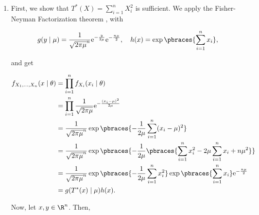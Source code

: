 \begin{solution}

\phantom{}

\begin{enumerate}[label = (\alph*)]

    \item First, we show that $T^\ast(X) = \sum_{i=1}^n X_i^2$ is sufficient.
    We apply the Fisher-Neyman Factorization theorem \cite[lecture 8, slide 13]{EStat}, with

    \begin{align*}
        g(y \mid \mu) = \frac{1}{\sqrt{2 \pi \mu}^n} \mathrm e^{-\frac{y}{2 \mu}} \mathrm e^{-\frac{n \mu}{2}},
        \quad
        h(x) = \exp \pbraces{\sum_{i=1}^n x_i},
    \end{align*}

    and get

    \begin{align*}
        f_{X_1, \dots, X_n}(x \mid \theta)
        & =
        \prod_{i=1}^n
            f_{X_i}(x_i \mid \theta) \\
        & =
        \prod_{i=1}^n
            \frac{1}{\sqrt{2 \pi \mu}}
            \mathrm e^{-\frac{(x_i - \mu)^2}{2 \mu}} \\
        & =
        \frac{1}{\sqrt{2 \pi \mu}^n}
        \exp
        \pbraces
        {
            -\frac{1}{2 \mu}
            \sum_{i=1}^n
                (x_i - \mu)^2
        } \\
        & =
        \frac{1}{\sqrt{2 \pi \mu}^n}
        \exp
        \pbraces
        {
            -\frac{1}{2 \mu}
            \pbraces
            {
                \sum_{i=1}^n
                    x_i^2
                -
                2 \mu
                \sum_{i=1}^n
                    x_i
                +
                n \mu^2
            }
        } \\
        & =
        \frac{1}{\sqrt{2 \pi \mu}^n}
        \exp
        \pbraces
        {
            -\frac{1}{2 \mu}
            \sum_{i=1}^n
                x_i^2
        }
        \exp \pbraces{\sum_{i=1}^n x_i}
        \mathrm e^{-\frac{n \mu}{2}} \\
        & =
        g(T^\ast(x) \mid \mu) h(x).
    \end{align*}

    Now, let $x, y \in \R^n$.
    Then,


\end{enumerate}
\end{solution}
